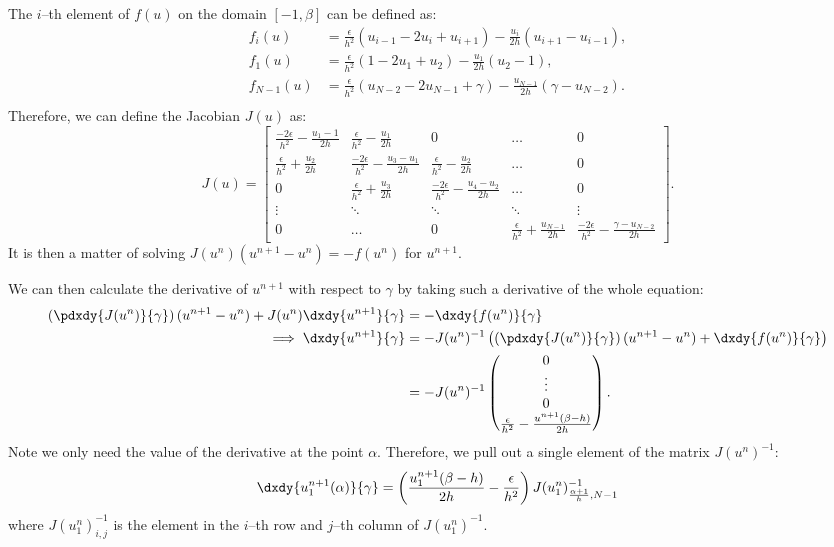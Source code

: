 \documentclass{book}
\begin{document}
The $i$--th element of $f(u)$ on the domain $[-1,\beta]$ can be defined as:
\begin{align*}
f_i(u) & = \frac{\epsilon}{h^2} \left ( u_{i-1} - 2 u_i + u_{i+1} \right )
- \frac{u_i}{2h} \left ( u_{i+1} - u_{i-1} \right ) , \\
f_1(u) & = \frac{\epsilon}{h^2} \left ( 1 - 2 u_1 + u_2 \right )
- \frac{u_1}{2h} \left ( u_2 - 1 \right ) , \\
f_{N-1}(u) & = \frac{\epsilon}{h^2} \left ( u_{N-2} - 2 u_{N-1} + \gamma \right )
- \frac{u_{N-1}}{2h} \left ( \gamma - u_{N-2} \right ) . \\
\end{align*}
Therefore, we can define the Jacobian $J(u)$ as:
\begin{equation*}
J(u) = \begin{bmatrix} \frac{-2\epsilon}{h^2} - \frac{u_1 - 1}{2h} & \frac{\epsilon}{h^2} - \frac{u_1}{2h} & 0 & \dots & 0 \\
\frac{\epsilon}{h^2} + \frac{u_2}{2h} & \frac{-2\epsilon}{h^2} - \frac{u_3 - u_1}{2h} & \frac{\epsilon}{h^2} - \frac{u_2}{2h} & \dots & 0 \\
0 & \frac{\epsilon}{h^2} + \frac{u_3}{2h} & \frac{-2\epsilon}{h^2} - \frac{u_4 - u_2}{2h} & \dots & 0 \\
\vdots & \ddots & \ddots & \ddots & \vdots \\
0 & \dots & 0 & \frac{\epsilon}{h^2} + \frac{u_{N-1}}{2h} & \frac{-2\epsilon}{h^2} - \frac{\gamma - u_{N-2}}{2h} \end{bmatrix} .
\end{equation*}
It is then a matter of solving $J(u^n) (u^{n+1} - u^n) = -f(u^n)$ for $u^{n+1}$.

We can then calculate the derivative of $u^{n+1}$ with respect to $\gamma$ by taking such a derivative of the whole equation:
\begin{align*}
\left ( \pdxdy{J(u^n)}{\gamma} \right ) (u^{n+1} - u^n) + J(u^n) \dxdy{u^{n+1}}{\gamma} & = - \dxdy{f(u^n)}{\gamma} \\
\implies \dxdy{u^{n+1}}{\gamma} & = -J(u^n)^{-1} \left ( \left ( \pdxdy{J(u^n)}{\gamma} \right ) (u^{n+1} - u^n) + \dxdy{f(u^n)}{\gamma} \right ) \\
& = -J(u^n)^{-1} \begin{pmatrix} 0 \\ \vdots \\ 0 \\ \frac{\epsilon}{h^2} - \frac{u^{n+1}(\beta-h)}{2h} \end{pmatrix} .
\end{align*}
Note we only need the value of the derivative at the point $\alpha$.
Therefore, we pull out a single element of the matrix $J(u^n)^{-1}$:
\begin{equation*}
\dxdy{u^{n+1}_1(\alpha)}{\gamma} = \left ( \frac{u^{n+1}_1(\beta-h)}{2h} - \frac{\epsilon}{h^2} \right ) J(u^n_1)^{-1}_{\frac{\alpha+1}{h},N-1}
\end{equation*}
where $J(u^n_1)^{-1}_{i,j}$ is the element in the $i$--th row and $j$--th column of $J(u^n_1)^{-1}$.
\end{document}
